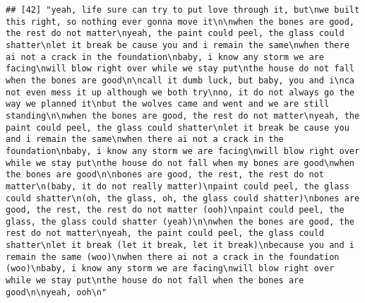 \documentclass[]{article}
\begin{document}
\begin{verbatim}
## [42] "yeah, life sure can try to put love through it, but\nwe built this right, so nothing ever gonna move it\n\nwhen the bones are good, the rest do not matter\nyeah, the paint could peel, the glass could shatter\nlet it break be cause you and i remain the same\nwhen there ai not a crack in the foundation\nbaby, i know any storm we are facing\nwill blow right over while we stay put\nthe house do not fall when the bones are good\n\ncall it dumb luck, but baby, you and i\nca not even mess it up although we both try\nno, it do not always go the way we planned it\nbut the wolves came and went and we are still standing\n\nwhen the bones are good, the rest do not matter\nyeah, the paint could peel, the glass could shatter\nlet it break be cause you and i remain the same\nwhen there ai not a crack in the foundation\nbaby, i know any storm we are facing\nwill blow right over while we stay put\nthe house do not fall when my bones are good\nwhen the bones are good\n\nbones are good, the rest, the rest do not matter\n(baby, it do not really matter)\npaint could peel, the glass could shatter\n(oh, the glass, oh, the glass could shatter)\nbones are good, the rest, the rest do not matter (ooh)\npaint could peel, the glass, the glass could shatter (yeah)\n\nwhen the bones are good, the rest do not matter\nyeah, the paint could peel, the glass could shatter\nlet it break (let it break, let it break)\nbecause you and i remain the same (woo)\nwhen there ai not a crack in the foundation (woo)\nbaby, i know any storm we are facing\nwill blow right over while we stay put\nthe house do not fall when the bones are good\n\nyeah, ooh\n"                                                                                                                                                                                                                                                                                                                                                                                                                                                                                                                                                                                                                                                                                                                                                                                                                                                                                                                                                                                                                                                                                                                                                                                                                                                                                

\end{verbatim}
\end{document}
